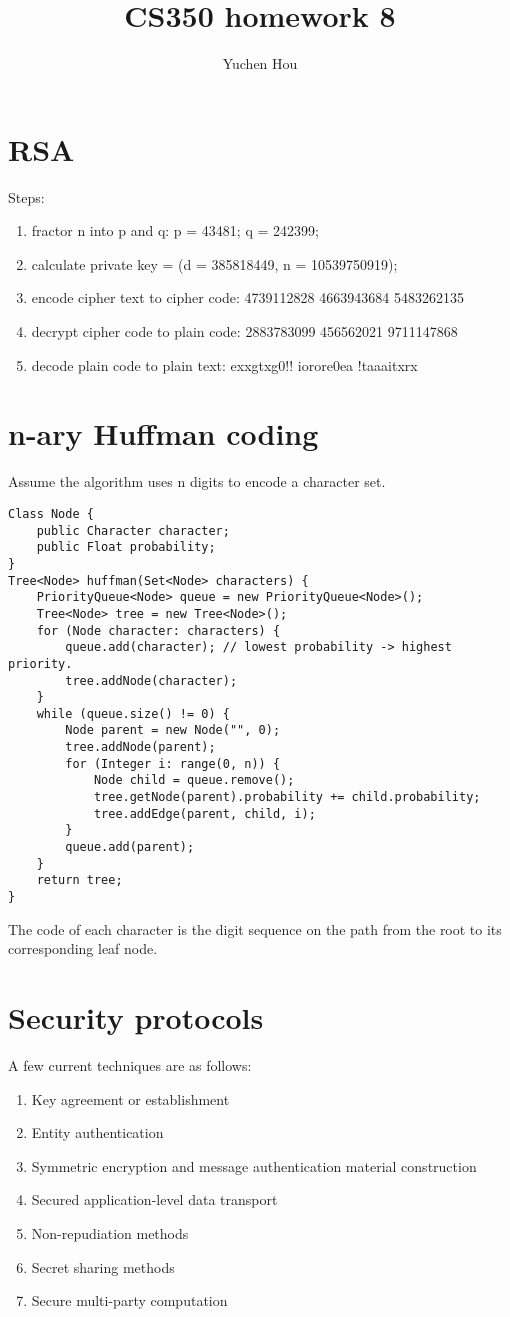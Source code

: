 \documentclass{article}
\begin{document}
\lstset{language=Java, tabsize=4}
\title{CS350 homework 8}
\author{Yuchen Hou}
\maketitle

\section{RSA}
Steps:
\begin{enumerate}
  \item fractor n into p and q: p = 43481; q = 242399;
  \item calculate private key = (d = 385818449, n = 10539750919);
  \item encode cipher text to cipher code: 4739112828 4663943684 5483262135
  \item decrypt cipher code to plain code: 2883783099 456562021 9711147868
  \item decode plain code to plain text: exxgtxg0!! iorore0ea !taaaitxrx
\end{enumerate}

\section{n-ary Huffman coding}
Assume the algorithm uses n digits to encode a character set.
\begin{lstlisting}
Class Node {
	public Character character;
	public Float probability;
}
Tree<Node> huffman(Set<Node> characters) {
	PriorityQueue<Node> queue = new PriorityQueue<Node>();
	Tree<Node> tree = new Tree<Node>();
	for (Node character: characters) {
		queue.add(character); // lowest probability -> highest priority.
		tree.addNode(character);
	}
	while (queue.size() != 0) {
		Node parent = new Node("", 0);
		tree.addNode(parent);
		for (Integer i: range(0, n)) {
			Node child = queue.remove();
			tree.getNode(parent).probability += child.probability;
			tree.addEdge(parent, child, i);
		}
		queue.add(parent);
	}
	return tree;
}
\end{lstlisting}
The code of each character is the digit sequence on the path from the root to
its corresponding leaf node.

\section{Security protocols}
A few current techniques are as follows:
\begin{enumerate}
  \item Key agreement or establishment
  \item Entity authentication
  \item Symmetric encryption and message authentication material construction
  \item Secured application-level data transport
  \item Non-repudiation methods
  \item Secret sharing methods
  \item Secure multi-party computation
\end{enumerate}
\end{document}
